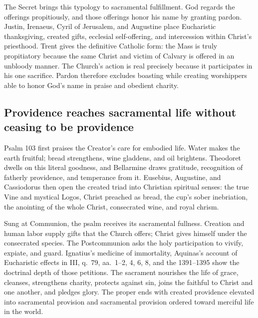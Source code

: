 The Secret brings this typology to sacramental fulfillment. God regards the
offerings propitiously, and those offerings honor his name by granting pardon.
Justin, Irenaeus, Cyril of Jerusalem, and Augustine place Eucharistic
thanksgiving, created gifts, ecclesial self-offering, and intercession within
Christ's priesthood. Trent gives the definitive Catholic form: the Mass is
truly propitiatory because the same Christ and victim of Calvary is offered in
an unbloody manner. The Church's action is real precisely because it
participates in his one sacrifice. Pardon therefore excludes boasting while
creating worshippers able to honor God's name in praise and obedient charity.

\subsection*{Providence reaches sacramental life without ceasing to be providence}

Psalm 103 first praises the Creator's care for embodied life. Water makes the
earth fruitful; bread strengthens, wine gladdens, and oil brightens. Theodoret
dwells on this literal goodness, and Bellarmine draws gratitude, recognition of
fatherly providence, and temperance from it. Eusebius, Augustine, and Cassiodorus then open the
created triad into Christian spiritual senses: the true Vine and mystical
Logos, Christ preached as bread, the cup's sober inebriation, the anointing of
the whole Christ, consecrated wine, and royal chrism.

Sung at Communion, the psalm receives its sacramental fullness. Creation and
human labor supply gifts that the Church offers; Christ gives himself under
the consecrated species. The Postcommunion asks the holy participation to
vivify, expiate, and guard. Ignatius's medicine of immortality, Aquinas's
account of Eucharistic effects in  III, q.~79, aa.~1--2, 4, 6, 8,
and the  1391--1395 show the
doctrinal depth of those petitions. The sacrament nourishes the life of grace,
cleanses, strengthens charity, protects against sin, joins the faithful to
Christ and one another, and pledges glory. The proper ends with created
providence elevated into sacramental provision and sacramental provision
ordered toward merciful life in the world.
